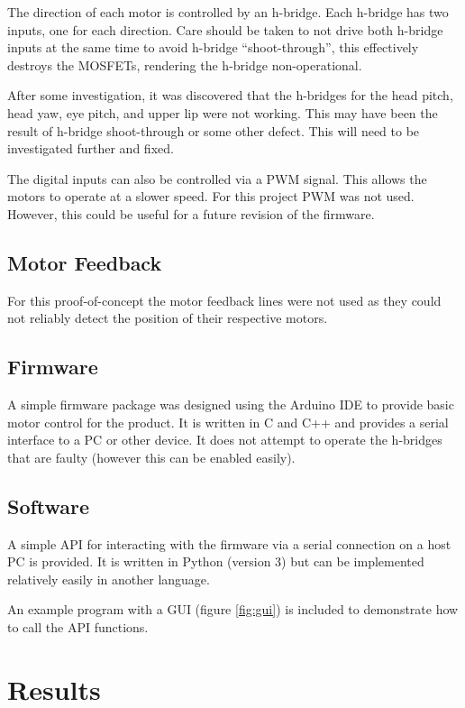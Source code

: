 \documentclass[11pt]{article} %
\begin{document}
The direction of each motor is controlled by an h-bridge.
Each h-bridge has two inputs, one for each direction.
Care should be taken to not drive both h-bridge inputs at the same time to avoid h-bridge ``shoot-through'', this effectively destroys the MOSFETs, rendering the h-bridge non-operational.

After some investigation, it was discovered that the h-bridges for the head pitch, head yaw, eye pitch, and upper lip were not working.
This may have been the result of h-bridge shoot-through or some other defect.
This will need to be investigated further and fixed.

The digital inputs can also be controlled via a PWM signal.
This allows the motors to operate at a slower speed.
For this project PWM was not used.
However, this could be useful for a future revision of the firmware.

\subsection{Motor Feedback}

For this proof-of-concept the motor feedback lines were not used as they could not reliably detect the position of their respective motors.

\subsection{Firmware}

A simple firmware package was designed using the Arduino IDE to provide basic motor control for the product.
It is written in C and C++ and provides a serial interface to a PC or other device. 
It does not attempt to operate the h-bridges that are faulty (however this can be enabled easily).

\subsection{Software}

A simple API for interacting with the firmware via a serial connection on a host PC is provided.
It is written in Python (version 3) but can be implemented relatively easily in another language.

An example program with a GUI (figure \ref{fig:gui}) is included to demonstrate how to call the API functions.


\section{Results}
\end{document}
